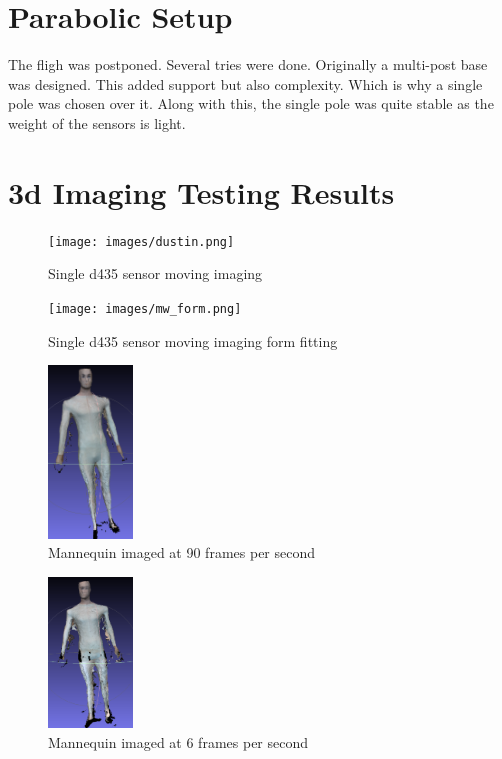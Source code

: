 \section{Parabolic Setup}
The fligh was postponed. Several tries were done. Originally a multi-post base was designed. This added support but also complexity. Which is why a single pole was chosen over it. Along with this, the single pole was quite stable as the weight of the sensors is light.

\section{3d Imaging Testing Results}

\begin{figure}[!htb]
	\caption{Single d435 sensor moving imaging}
	\centering
	\texttt{[image: images/dustin.png]}
\end{figure}

\begin{figure}[!htb]
	\caption{Single d435 sensor moving imaging form fitting}
	\centering
	\texttt{[image: images/mw\_form.png]}
\end{figure}



\begin{figure}[!htb]
	\caption{Mannequin imaged at 90 frames per second}
	\centering
	\includegraphics[width=0.2\textwidth]{images/90fps_mannequin.png}
\end{figure}


\begin{figure}[!htb]
	\caption{Mannequin imaged at 6 frames per second}
	\centering
	\includegraphics[width=0.2\textwidth]{images/6fps_mannequin.png}
\end{figure}

